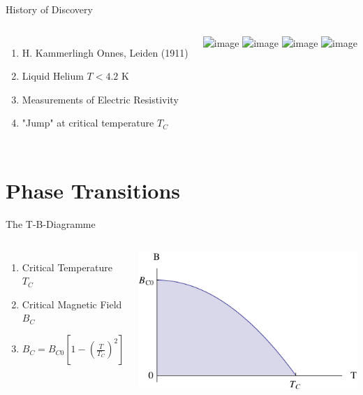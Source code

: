 \documentclass{beamer}
\begin{document}
\begin{frame}{History of Discovery}
\begin{columns}
        \begin{enumerate}[<+->]
\item H. Kammerlingh Onnes, Leiden (1911)
\item Liquid Helium $T<4.2$ K 
\item Measurements of Electric Resistivity
\item "Jump" at critical temperature $T_C$
\end{enumerate}                
        \includegraphics<1>[width=0.8\textwidth]{img/heike.jpg}
		\includegraphics<2>[width=0.8\textwidth]{img/heike.jpg}
		\includegraphics<3>[width=\textwidth]{img/heikemess.png}
		\includegraphics<4>[width=\textwidth]{img/heikemess.png}
\end{columns}
\end{frame}





\section{Phase Transitions}
\begin{frame}{The T-B-Diagramme}
\begin{columns}

\begin{enumerate}[<+->]
\item \small Critical Temperature $T_C$
\item \small Critical Magnetic Field $B_C$
\item \small $B_C=B_{C0} \left[ 1 - \left(\frac{T}{T_C}\right)^2 \right]$
\end{enumerate}    
            
\includegraphics[width=\textwidth]{img/tb0.pdf}
\end{columns}

\end{frame}
\end{document}
